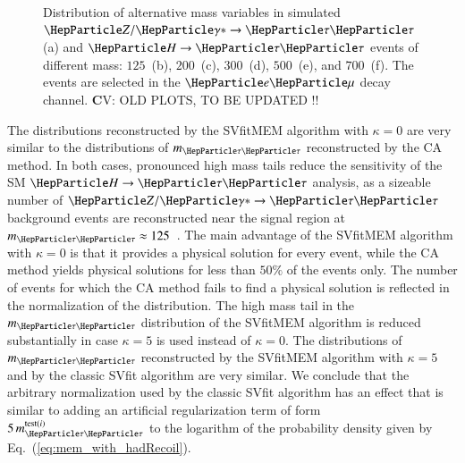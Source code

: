\begin{figure}
\begin{center}
\end{center}
\caption{
  Distribution of alternative mass variables in simulated $\PZ/\Pggx
  \to \Pgt\Pgt$ (a) and $\PHiggs \to \Pgt\Pgt$ events of different mass:
  $125$~\GeV (b), $200$~\GeV (c), $300$~\GeV (d), $500$~\GeV (e), and
  $700$~\GeV (f).
  The events are selected in the $\Pe\Pgm$ decay channel.
  {\textbf CV: OLD PLOTS, TO BE UPDATED !!}
}
\label{fig:massDistributions_emu}
\end{figure}

The distributions reconstructed by the SVfitMEM algorithm with $\kappa = 0$ are very similar to the distributions of $m_{\Pgt\Pgt}$ reconstructed by the CA method.
In both cases, pronounced high mass tails reduce the sensitivity of the SM $\PHiggs \to \Pgt\Pgt$ analysis,
as a sizeable number of $\PZ/\Pggx \to \Pgt\Pgt$ background events
are reconstructed near the signal region at $m_{\Pgt\Pgt} \approx 125$~\GeV.
The main advantage of the SVfitMEM algorithm with $\kappa =
0$ is that it provides a physical solution for every event,
while the CA method yields physical solutions for less than $50\%$ of
the events only.
The number of events for which the CA method fails to find a physical solution is reflected in the normalization of the distribution.
The high mass tail in the $m_{\Pgt\Pgt}$ distribution of
the SVfitMEM algorithm is reduced substantially in case
$\kappa = 5$ is used instead of $\kappa = 0$.
The distributions of $m_{\Pgt\Pgt}$ reconstructed by the SVfitMEM
algorithm with $\kappa = 5$ and by the classic SVfit algorithm are
very similar.
We conclude that the arbitrary normalization used by the classic SVfit
algorithm has an effect that is similar to adding 
an artificial regularization term of form $5 \,
m_{\Pgt\Pgt}^{\textrm{test}(i)}$ to the logarithm of the probability
density given by Eq.~(\ref{eq:mem_with_hadRecoil}).

